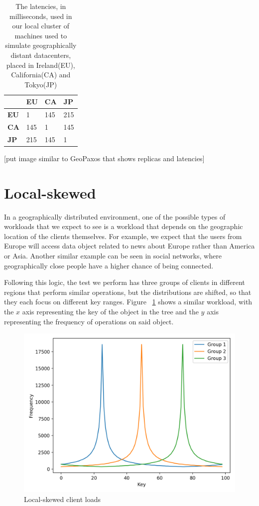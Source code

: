 \begin{table}[!htb]
  \centering
  \begin{tabular}{l l l l}
    \hline
    & \textbf{EU} & \textbf{CA} & \textbf{JP} \\
    \hline
    \textbf{EU} & 1 & 145 & 215 \\
    \textbf{CA} & 145 & 1 & 145 \\
    \textbf{JP} & 215 & 145 & 1 \\
    \hline
  \end{tabular}
  \caption{The latencies, in milliseconds, used in our local cluster of machines used to simulate geographically distant datacenters, placed in Ireland(EU), California(CA) and Tokyo(JP)}\label{tab:latencies}
\end{table}

[put image similar to GeoPaxos that shows replicas and latencies]

\section{Local-skewed}\label{sec:local-skewed}
In a geographically distributed environment, one of the possible types of workloads that we expect to see is a workload that depends on the geographic location of the clients themselves. For example, we expect that the users from Europe will access data object related to news about Europe rather than America or Asia. Another similar example can be seen in social networks, where geographically close people have a higher chance of being connected.

Following this logic, the test we perform has three groups of clients in different regions that perform similar operations, but the distributions are shifted, so that they each focus on different key ranges. Figure ~\ref{fig:local-skewed-loads} shows a similar workload, with the $x$ axis representing the key of the object in the tree and the $y$ axis representing the frequency of operations on said object.

\begin{figure}[!htb]
  \centering
  \includegraphics[width=\textwidth,height=\textheight,keepaspectratio]{img/clients_loads.png}
  \caption{ Local-skewed client loads }
  \label{fig:local-skewed-loads}
\end{figure}

